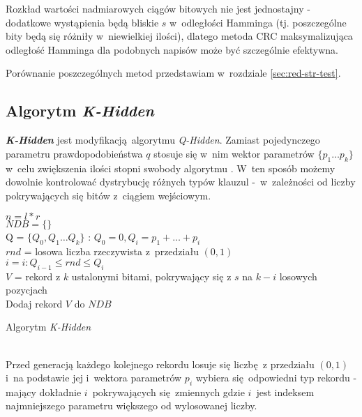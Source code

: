 Rozkład wartości nadmiarowych ciągów bitowych nie jest jednostajny - dodatkowe wystąpienia będą bliskie $s$ w~odległości Hamminga
(tj. poszczególne bity będą się różniły w~niewielkiej ilości), dlatego metoda CRC maksymalizująca odległość Hamminga 
dla podobnych napisów może być szczególnie efektywna. \cite{HARD-NDB}

Porównanie poszczególnych metod przedstawiam w~rozdziale \ref{sec:red-str-test}.

\subsection{Algorytm \textit{K-Hidden}}
\textbf{\textit{K-Hidden}} jest modyfikacją algorytmu \textit{Q-Hidden}. Zamiast pojedynczego parametru prawdopodobieństwa $q$ stosuje się w~nim
wektor parametrów $\{p_1 \dots p_k\}$ w~celu zwiększenia ilości stopni swobody algorytmu \cite{k-hidden}. W~ten sposób możemy dowolnie kontrolować dystrybucję
różnych typów klauzul -~w~zależności od liczby pokrywających się bitów z~ciągiem wejściowym.
\\



 \begin{algorithm}[!htb]
    \SetAlgoLined
    
    $n = l * r$\\
    $NDB = \{\}$\\
    Q = $\{Q_0, Q_1 \dots Q_k \}$ : $Q_0 = 0, Q_i = p_1 + \dots + p_i $\\
    {
        $rnd$ = losowa liczba rzeczywista z~przedziału $(0,1)$\\
        $i = i : Q_{i-1} \le rnd \le Q_i$\\
        $V$ = rekord z $k$ ustalonymi bitami, pokrywający się z $s$ na $k-i$ losowych pozycjach\\
        Dodaj rekord $V$ do $NDB$
    } 
    \caption{Algorytm \textit{K-Hidden}}
    \label{alg:khidden}
\end{algorithm}
~\\
Przed generacją każdego kolejnego rekordu losuje się liczbę z przedziału $(0,1)$ i~na podstawie jej i~wektora parametrów $p_i$ wybiera
się odpowiedni typ rekordu - mający dokładnie $i$~pokrywających się zmiennych gdzie $i$~jest indeksem najmniejszego parametru większego
od wylosowanej liczby.

